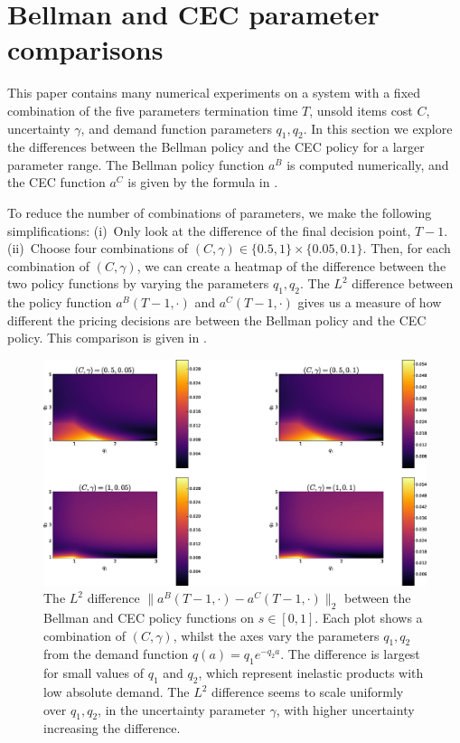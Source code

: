 \documentclass[main.tex]{subfiles}
\begin{document}
\listoftodos

\section{Bellman and CEC parameter comparisons}\label{sec:parameter_comparison}
This paper contains many numerical experiments on a system
with a fixed combination of the five parameters
termination time $T$, unsold items cost $C$, uncertainty $\gamma$, and
demand function parameters $q_1,q_2$.
In this section we explore the differences between the Bellman policy
and the CEC policy for a larger parameter range.
The Bellman policy function $a^B$ is computed numerically, and
the CEC function $a^C$ is given by the formula in
.

To reduce the number of combinations of parameters, we make the
following simplifications:
(i)~Only look at the difference of the final decision point, $T-1$.
(ii)~Choose four combinations of
$(C,\gamma)\in\{0.5,1\}\times\{0.05,0.1\}$.
Then,
for each combination of $(C,\gamma)$,
we can create a heatmap of the difference between the two policy
functions by varying the parameters $q_1,q_2$.
The $L^2$ difference between the
policy function $a^B(T-1,\cdot)$ and $a^C(T-1,\cdot)$
gives us a measure of how different the pricing decisions are between
the Bellman policy and the CEC policy.
This comparison is given in .
\begin{figure}[htbp]
  \includegraphics[width=1\textwidth]{./img/policy_diff_heatmaps}
  \caption{The $L^2$ difference $\|a^B(T-1,\cdot)-a^C(T-1,\cdot)\|_2$
    between the Bellman and CEC policy functions on $s\in[0,1]$.
    Each plot shows a combination of $(C,\gamma)$, whilst
    the axes vary the parameters $q_1,q_2$ from the demand function
    $q(a)=q_1e^{-q_2a}$.
    The difference is largest for small values of $q_1$ and $q_2$,
    which represent inelastic products with low absolute demand.
    The $L^2$ difference seems to scale uniformly over $q_1,q_2$, in the uncertainty
    parameter $\gamma$, with higher uncertainty increasing the
    difference.
  }\label{fig:policy_diff_heatmaps}
\end{figure}
\end{document}
